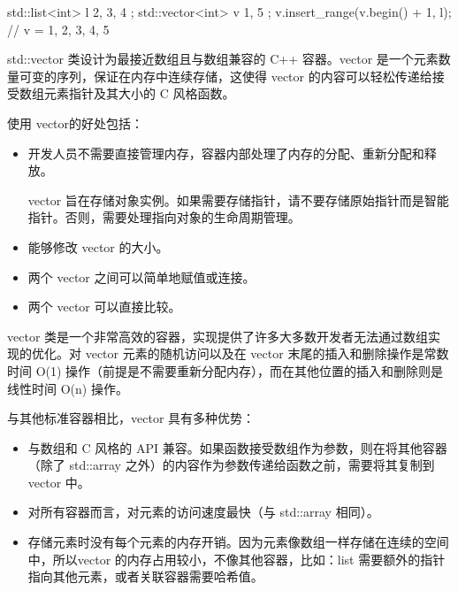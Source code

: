 \begin{cpp}
std::list<int>   l{ 2, 3, 4 };
std::vector<int> v{ 1, 5 };
v.insert_range(v.begin() + 1, l); // v = {1, 2, 3, 4, 5}
\end{cpp}


std::vector 类设计为最接近数组且与数组兼容的 C++ 容器。vector 是一个元素数量可变的序列，保证在内存中连续存储，这使得 vector 的内容可以轻松传递给接受数组元素指针及其大小的 C 风格函数。

使用 vector的好处包括：

\begin{itemize}
\item
开发人员不需要直接管理内存，容器内部处理了内存的分配、重新分配和释放。

\begin{myNotic}
vector 旨在存储对象实例。如果需要存储指针，请不要存储原始指针而是智能指针。否则，需要处理指向对象的生命周期管理。
\end{myNotic}

\item
能够修改 vector 的大小。

\item
两个 vector 之间可以简单地赋值或连接。

\item
两个 vector 可以直接比较。
\end{itemize}

vector 类是一个非常高效的容器，实现提供了许多大多数开发者无法通过数组实现的优化。对 vector 元素的随机访问以及在 vector 末尾的插入和删除操作是常数时间 O(1) 操作（前提是不需要重新分配内存），而在其他位置的插入和删除则是线性时间 O(n) 操作。

与其他标准容器相比，vector 具有多种优势：

\begin{itemize}
\item
与数组和 C 风格的 API 兼容。如果函数接受数组作为参数，则在将其他容器（除了 std::array 之外）的内容作为参数传递给函数之前，需要将其复制到 vector 中。

\item
对所有容器而言，对元素的访问速度最快（与 std::array 相同）。

\item
存储元素时没有每个元素的内存开销。因为元素像数组一样存储在连续的空间中，所以vector 的内存占用较小，不像其他容器，比如：list 需要额外的指针指向其他元素，或者关联容器需要哈希值。
\end{itemize}

